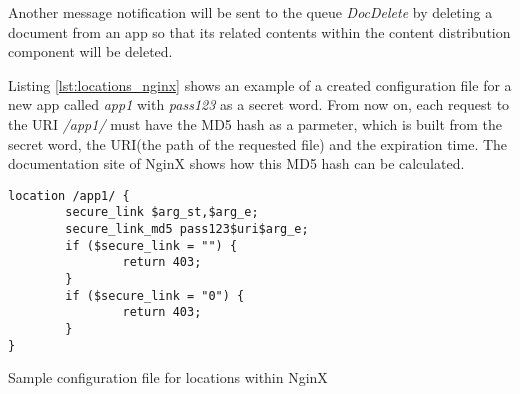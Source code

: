 Another message notification will be sent to the queue \textit{DocDelete} by deleting a document from an app so that its related contents within the content distribution component will be deleted.

Listing \ref{lst:locations_nginx} shows an example of a created configuration file for a new app called \textit{app1} with \textit{pass123} as a secret word. From now on, each request to the URI \textit{/app1/} must have the MD5 hash as a parmeter, which is built from the secret word, the URI(the path of the requested file) and the expiration time. The documentation site of NginX \cite{nginx:securelink} shows how this MD5 hash can be calculated.

\begin{code}
\begin{verbatim}
location /app1/ {
        secure_link $arg_st,$arg_e;
        secure_link_md5 pass123$uri$arg_e;
        if ($secure_link = "") {
                return 403;
        }
        if ($secure_link = "0") {
                return 403;
        }
}
\end{verbatim}
\caption{Sample configuration file for locations within NginX}
\label{lst:locations_nginx}
\end{code}


	
	
	


